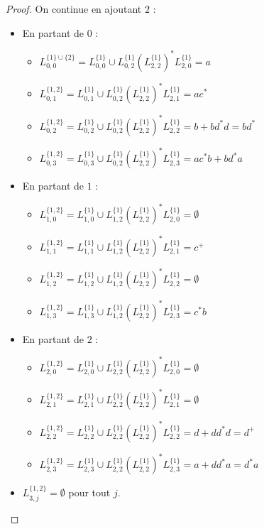 \begin{proof}
On continue en ajoutant $2$ : 


\begin{itemize}
\item En partant de $0$ :
   \begin{itemize}
	 \item $L_{0,0}^{\{1\} \cup \{2\}} = L_{0,0}^{\{1\}} \cup L_{0,2}^{\{1\}}(L_{2,2}^{\{1\}})^*L_{2,0}^{\{1\}} = a$
	 \item $L_{0,1}^{\{1,2\}} = L_{0,1}^{\{1\}} \cup L_{0,2}^{\{1\}}(L_{2,2}^{\{1\}})^*L_{2,1}^{\{1\}} = ac^*$
	 \item $L_{0,2}^{\{1,2\}} = L_{0,2}^{\{1\}} \cup L_{0,2}^{\{1\}}(L_{2,2}^{\{1\}})^*L_{2,2}^{\{1\}} = b + bd^*d = bd^*$
	 \item $L_{0,3}^{\{1,2\}} = L_{0,3}^{\{1\}} \cup L_{0,2}^{\{1\}}(L_{2,2}^{\{1\}})^*L_{2,3}^{\{1\}} = ac^*b + bd^*a$
   \end{itemize}
\item En partant de $1$ :
   \begin{itemize}
	 \item $L_{1,0}^{\{1,2\}} = L_{1,0}^{\{1\}} \cup L_{1,2}^{\{1\}}(L_{2,2}^{\{1\}})^*L_{2,0}^{\{1\}} = \emptyset$
	 \item $L_{1,1}^{\{1,2\}} = L_{1,1}^{\{1\}} \cup L_{1,2}^{\{1\}}(L_{2,2}^{\{1\}})^*L_{2,1}^{\{1\}} = c^+$
	 \item $L_{1,2}^{\{1,2\}} = L_{1,2}^{\{1\}} \cup L_{1,2}^{\{1\}}(L_{2,2}^{\{1\}})^*L_{2,2}^{\{1\}} = \emptyset$
	 \item $L_{1,3}^{\{1,2\}} = L_{1,3}^{\{1\}} \cup L_{1,2}^{\{1\}}(L_{2,2}^{\{1\}})^*L_{2,3}^{\{1\}} = c^*b$
   \end{itemize}
\item En partant de $2$ :
   \begin{itemize}
	 \item $L_{2,0}^{\{1,2\}} = L_{2,0}^{\{1\}} \cup L_{2,2}^{\{1\}}(L_{2,2}^{\{1\}})^*L_{2,0}^{\{1\}} = \emptyset$
	 \item $L_{2,1}^{\{1,2\}} = L_{2,1}^{\{1\}} \cup L_{2,2}^{\{1\}}(L_{2,2}^{\{1\}})^*L_{2,1}^{\{1\}} = \emptyset$
	 \item $L_{2,2}^{\{1,2\}} = L_{2,2}^{\{1\}} \cup L_{2,2}^{\{1\}}(L_{2,2}^{\{1\}})^*L_{2,2}^{\{1\}} = d + dd^*d = d^+$
	 \item $L_{2,3}^{\{1,2\}} = L_{2,3}^{\{1\}} \cup L_{2,2}^{\{1\}}(L_{2,2}^{\{1\}})^*L_{2,3}^{\{1\}} = a + dd^*a = d^*a$
   \end{itemize}
\item $L_{3,j}^{\{1,2\}} = \emptyset$ pour tout $j$.
\end{itemize}


\end{proof}
